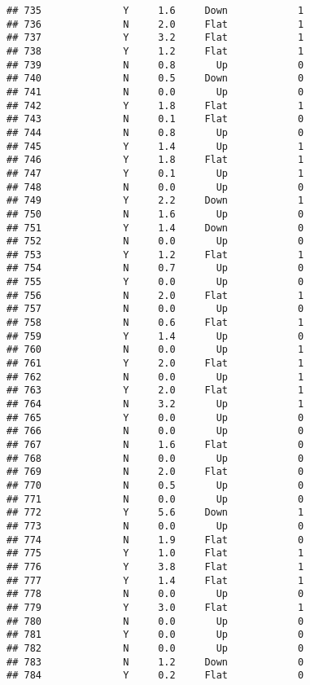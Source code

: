 \documentclass[
]{article}
\begin{document}
\begin{verbatim}
## 735              Y     1.6     Down            1
## 736              N     2.0     Flat            1
## 737              Y     3.2     Flat            1
## 738              Y     1.2     Flat            1
## 739              N     0.8       Up            0
## 740              N     0.5     Down            0
## 741              N     0.0       Up            0
## 742              Y     1.8     Flat            1
## 743              N     0.1     Flat            0
## 744              N     0.8       Up            0
## 745              Y     1.4       Up            1
## 746              Y     1.8     Flat            1
## 747              Y     0.1       Up            1
## 748              N     0.0       Up            0
## 749              Y     2.2     Down            1
## 750              N     1.6       Up            0
## 751              Y     1.4     Down            0
## 752              N     0.0       Up            0
## 753              Y     1.2     Flat            1
## 754              N     0.7       Up            0
## 755              Y     0.0       Up            0
## 756              N     2.0     Flat            1
## 757              N     0.0       Up            0
## 758              N     0.6     Flat            1
## 759              Y     1.4       Up            0
## 760              N     0.0       Up            1
## 761              Y     2.0     Flat            1
## 762              N     0.0       Up            1
## 763              Y     2.0     Flat            1
## 764              N     3.2       Up            1
## 765              Y     0.0       Up            0
## 766              N     0.0       Up            0
## 767              N     1.6     Flat            0
## 768              N     0.0       Up            0
## 769              N     2.0     Flat            0
## 770              N     0.5       Up            0
## 771              N     0.0       Up            0
## 772              Y     5.6     Down            1
## 773              N     0.0       Up            0
## 774              N     1.9     Flat            0
## 775              Y     1.0     Flat            1
## 776              Y     3.8     Flat            1
## 777              Y     1.4     Flat            1
## 778              N     0.0       Up            0
## 779              Y     3.0     Flat            1
## 780              N     0.0       Up            0
## 781              Y     0.0       Up            0
## 782              N     0.0       Up            0
## 783              N     1.2     Down            0
## 784              Y     0.2     Flat            0

\end{verbatim}
\end{document}
